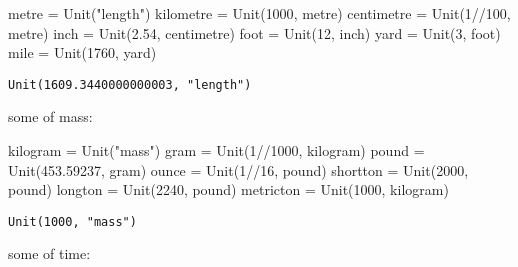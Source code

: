 \documentclass[
  letterpaper,
  DIV=11,
  numbers=noendperiod]{scrreprt}
\newenvironment{Shaded}{\begin{snugshade}}{\end{snugshade}}
\newcommand{\FloatTok}[1]{\textcolor[rgb]{0.68,0.00,0.00}{#1}}
\newcommand{\FunctionTok}[1]{\textcolor[rgb]{0.28,0.35,0.67}{#1}}
\newcommand{\NormalTok}[1]{\textcolor[rgb]{0.00,0.23,0.31}{#1}}
\newcommand{\OperatorTok}[1]{\textcolor[rgb]{0.37,0.37,0.37}{#1}}
\newcommand{\StringTok}[1]{\textcolor[rgb]{0.13,0.47,0.30}{#1}}
\begin{document}
\begin{Shaded}
\begin{Highlighting}[]
\NormalTok{metre }\OperatorTok{=} \FunctionTok{Unit}\NormalTok{(}\StringTok{"length"}\NormalTok{)}
\NormalTok{kilometre }\OperatorTok{=} \FunctionTok{Unit}\NormalTok{(}\FloatTok{1000}\NormalTok{, metre)}
\NormalTok{centimetre }\OperatorTok{=} \FunctionTok{Unit}\NormalTok{(}\FloatTok{1}\OperatorTok{//}\FloatTok{100}\NormalTok{, metre)}
\NormalTok{inch }\OperatorTok{=} \FunctionTok{Unit}\NormalTok{(}\FloatTok{2.54}\NormalTok{, centimetre)}
\NormalTok{foot }\OperatorTok{=} \FunctionTok{Unit}\NormalTok{(}\FloatTok{12}\NormalTok{, inch)}
\NormalTok{yard }\OperatorTok{=} \FunctionTok{Unit}\NormalTok{(}\FloatTok{3}\NormalTok{, foot)}
\NormalTok{mile }\OperatorTok{=} \FunctionTok{Unit}\NormalTok{(}\FloatTok{1760}\NormalTok{, yard)}
\end{Highlighting}
\end{Shaded}

\begin{verbatim}
Unit(1609.3440000000003, "length")
\end{verbatim}

some of mass:

\begin{Shaded}
\begin{Highlighting}[]
\NormalTok{kilogram }\OperatorTok{=} \FunctionTok{Unit}\NormalTok{(}\StringTok{"mass"}\NormalTok{)}
\NormalTok{gram }\OperatorTok{=} \FunctionTok{Unit}\NormalTok{(}\FloatTok{1}\OperatorTok{//}\FloatTok{1000}\NormalTok{, kilogram)}
\NormalTok{pound }\OperatorTok{=} \FunctionTok{Unit}\NormalTok{(}\FloatTok{453.59237}\NormalTok{, gram)}
\NormalTok{ounce }\OperatorTok{=} \FunctionTok{Unit}\NormalTok{(}\FloatTok{1}\OperatorTok{//}\FloatTok{16}\NormalTok{, pound)}
\NormalTok{shortton }\OperatorTok{=} \FunctionTok{Unit}\NormalTok{(}\FloatTok{2000}\NormalTok{, pound)}
\NormalTok{longton }\OperatorTok{=} \FunctionTok{Unit}\NormalTok{(}\FloatTok{2240}\NormalTok{, pound)}
\NormalTok{metricton }\OperatorTok{=} \FunctionTok{Unit}\NormalTok{(}\FloatTok{1000}\NormalTok{, kilogram)}
\end{Highlighting}
\end{Shaded}

\begin{verbatim}
Unit(1000, "mass")
\end{verbatim}

some of time:
\end{document}
